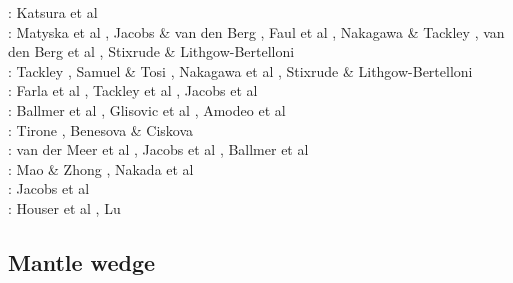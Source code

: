 \begin{scriptsize}
\twothousandten: Katsura et al \cite{kayy10}\\
\twothousandeleven: Matyska et al \cite{mayw11}, Jacobs \& van den Berg \cite{java11}, 
                    Faul et al \cite{faff11}, Nakagawa \& Tackley \cite{nata11}, 
                    van den Berg et al \cite{vayj11}, Stixrude \& Lithgow-Bertelloni \cite{stli11}\\
\twothousandtwelve: Tackley \cite{tack12}, Samuel \& Tosi \cite{sato12}, Nakagawa et al \cite{natd12}, Stixrude \& Lithgow-Bertelloni \cite{stli12}\\
\twothousandthirteen: Farla et al \cite{fakc13}, Tackley et al \cite{taab13}, Jacobs et al \cite{jasv13}\\
\twothousandfifteen: Ballmer et al \cite{basn15}, Glisovic et al \cite{glfa15}, Amodeo et al \cite{amsb15}\\
\twothousandsixteen: Tirone \cite{tiro16}, Benesova \& Ciskova \cite{beci16}\\
\twothousandseventeen: van der Meer et al \cite{vavs17}, Jacobs et al \cite{jasv17}, Ballmer et al \cite{bahh17}\\
\twothousandeighteen: Mao \& Zhong \cite{mazh18}, Nakada et al \cite{naoi18}\\
\twothousandnineteen: Jacobs et al \cite{jasv19}\\
\twothousandtwenty: Houser et al \cite{hohv20}, Lu \etal{} \cite{lufs20}
\end{scriptsize}


\subsection{Mantle wedge} 

